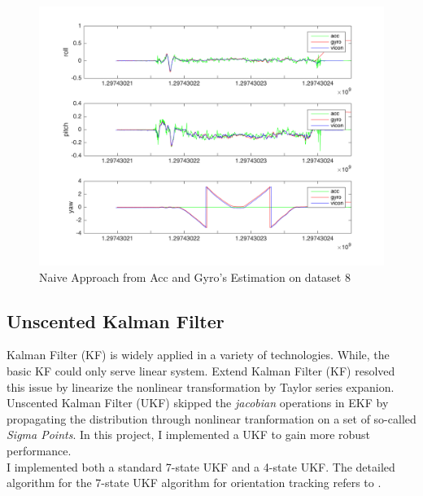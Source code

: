\documentclass[english]{article}
\begin{document}
\begin{figure}
\centering
\includegraphics[scale=0.5]{images/naive_approach_8.png} 
\caption{Naive Approach from Acc and Gyro's Estimation on dataset 8}
\label{fig:naive_8}
\end{figure}

\subsection {Unscented Kalman Filter}
Kalman Filter (KF) is widely applied in a variety of technologies. While, the basic KF could only serve linear system. Extend Kalman Filter (KF) resolved this issue by linearize the nonlinear transformation by Taylor series expanion. Unscented Kalman Filter (UKF) \cite{UKF97} skipped the \emph{jacobian} operations in EKF by propagating the distribution through nonlinear tranformation on a set of so-called \emph{Sigma Points}. In this project, I implemented a UKF to gain more robust performance. \\
I implemented both a standard 7-state UKF and a 4-state UKF. The detailed algorithm for the 7-state UKF algorithm for orientation tracking refers to \cite{Kraft03}. 
\end{document}
